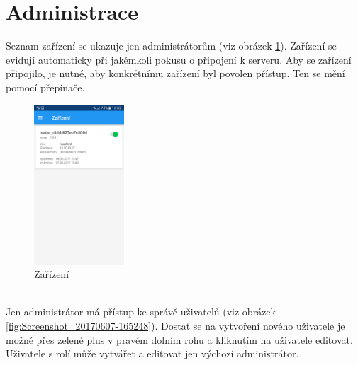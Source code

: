 \documentclass[12pt]{report}
\begin{document}
\section{Administrace}
Seznam zařízení se ukazuje jen administrátorům (viz obrázek \ref{fig:Screenshot_20170607-165221}). Zařízení se evidují automaticky při jakémkoli pokusu o připojení k serveru. Aby se zařízení připojilo, je nutné, aby konkrétnímu zařízení byl povolen přístup. Ten se mění pomocí přepínače.
\begin{figure}[H]
	\centering
	\includegraphics[width=0.3\textwidth]{../images/client_android/Screenshot_20170607-165221.png}	
	\caption{Zařízení}
	\label{fig:Screenshot_20170607-165221}
\end{figure}
\ \\
Jen administrátor má přístup ke správě uživatelů (viz obrázek \ref{fig:Screenshot_20170607-165248}).
Dostat se na vytvoření nového uživatele je možné přes zelené plus v pravém dolním rohu a kliknutím na uživatele editovat.
Uživatele s rolí  může vytvářet a editovat jen výchozí administrátor.
\end{document}
